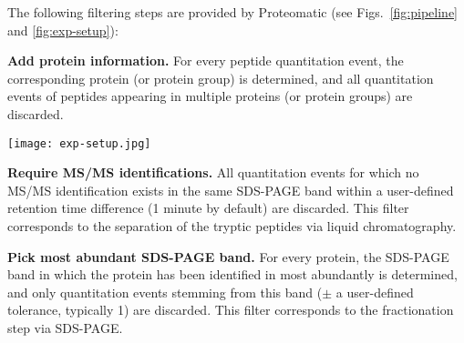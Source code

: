 The following filtering steps are provided by Proteomatic (see Figs.~\ref{fig:pipeline}
and \ref{fig:exp-setup}):

{\bf Add protein information.}
For every peptide quantitation event, the corresponding protein (or
protein group) is determined, and all quantitation events of peptides 
appearing in multiple proteins (or protein groups) are discarded.

\begin{figure*}
\texttt{[image: exp-setup.jpg]}
\caption{
    {\bf Depiction of the experimental workflow for protein identification and 
    quantitation. }
    Protein samples are subjected to two steps of separation: (a) SDS-PAGE, in 
    which each sample is fractionated into distinct bands, and (b) HPLC, which 
    separates the digested peptides from each SDS-PAGE band according to their 
    hydrophobicity. 
    The peptides eluting from the HPLC are measured using the {\em Big 5} 
    method which produces full scans and fragmentation scans in an interleaved 
    pattern. 
    While the fragmentation scans are used to identify peptides via a database 
    search (e. g. using OMSSA), the full scans are used by qTrace to quantify 
    the previously identified peptides using their light and heavy precursor 
    masses.
    The resulting quantitation events (QE) are then filtered in such a way
    that MS/MS identifications are required within a short retention time 
    difference. 
    The peptide quantitation events are compiled to protein quantitation events
    by determining which protein a peptide belongs to and discarding all events
    from ambiguous peptides.
    In addition, the spectral counts derived from the MS/MS identifications are 
    used to determine the SDS-PAGE band in which a protein has been must 
    abundantly identified in, and only quantitation events from this band 
    ($\pm$1) are accepted.
    Finally, the protein ratios are determined.
}
\label{fig:exp-setup}
\end{figure*}

{\bf Require MS/MS identifications.}
All quantitation events for which no MS/MS identification exists in the same 
SDS-PAGE band within a user-defined retention time difference (1 minute by 
default) are discarded. This filter corresponds to the separation of the 
tryptic peptides via liquid chromatography.

{\bf Pick most abundant SDS-PAGE band.}
For every protein, the SDS-PAGE band in which the protein has been identified 
in most abundantly is determined, and only quantitation events stemming from 
this band ($\pm$ a user-defined tolerance, typically 1) are discarded. This 
filter corresponds to the fractionation step via SDS-PAGE.

